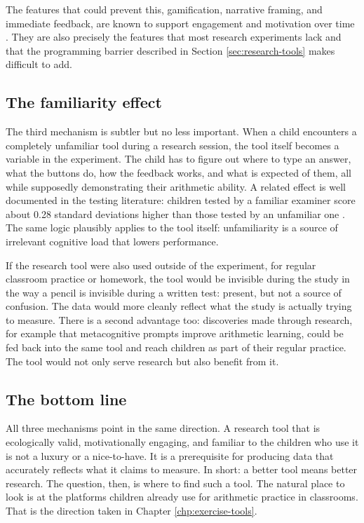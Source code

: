 The features that could prevent this, gamification, narrative framing, and immediate feedback, are known to support engagement and motivation over time \cite{manzanoleon2021gamification}. They are also precisely the features that most research experiments lack and that the programming barrier described in Section \ref{sec:research-tools} makes difficult to add.

\subsection{The familiarity effect}
The third mechanism is subtler but no less important. When a child encounters a completely unfamiliar tool during a research session, the tool itself becomes a variable in the experiment. The child has to figure out where to type an answer, what the buttons do, how the feedback works, and what is expected of them, all while supposedly demonstrating their arithmetic ability. A related effect is well documented in the testing literature: children tested by a familiar examiner score about 0.28 standard deviations higher than those tested by an unfamiliar one \cite{fuchs1986test}. The same logic plausibly applies to the tool itself: unfamiliarity is a source of irrelevant cognitive load that lowers performance.

If the research tool were also used outside of the experiment, for regular classroom practice or homework, the tool would be invisible during the study in the way a pencil is invisible during a written test: present, but not a source of confusion. The data would more cleanly reflect what the study is actually trying to measure. There is a second advantage too: discoveries made through research, for example that metacognitive prompts improve arithmetic learning, could be fed back into the same tool and reach children as part of their regular practice. The tool would not only serve research but also benefit from it.

\subsection{The bottom line}
All three mechanisms point in the same direction. A research tool that is ecologically valid, motivationally engaging, and familiar to the children who use it is not a luxury or a nice-to-have. It is a prerequisite for producing data that accurately reflects what it claims to measure. In short: a better tool means better research. The question, then, is where to find such a tool. The natural place to look is at the platforms children already use for arithmetic practice in classrooms. That is the direction taken in Chapter \ref{chp:exercise-tools}.

